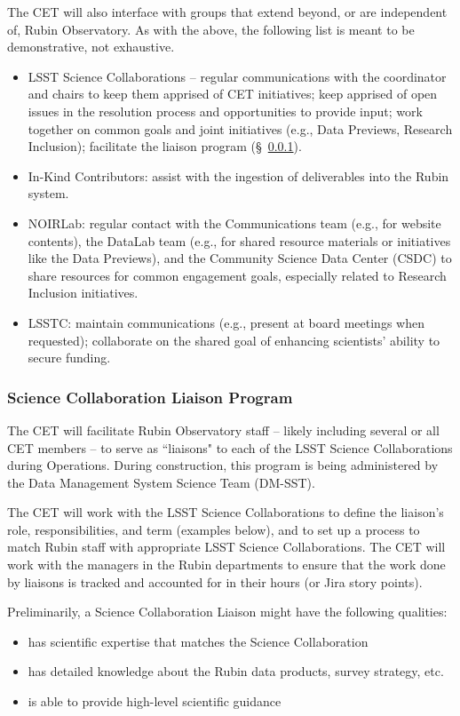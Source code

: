 \documentclass[DM,lsstdraft,toc]{lsstdoc}
\begin{document}
The CET will also interface with groups that extend beyond, or are independent of, Rubin Observatory.
As with the above, the following list is meant to be demonstrative, not exhaustive.
\begin{itemize}
\item LSST Science Collaborations -- regular communications with the coordinator and chairs to keep them apprised of CET initiatives; keep apprised of open issues in the resolution process and opportunities to provide input; work together on common goals and joint initiatives (e.g., Data Previews, Research Inclusion); facilitate the liaison program (\S~\ref{sssec:mod_interface_SCliaison}).
\item In-Kind Contributors: assist with the ingestion of deliverables into the Rubin system.
\item NOIRLab: regular contact with the Communications team (e.g., for website contents), the DataLab team (e.g., for shared resource materials or initiatives like the Data Previews), and the Community Science Data Center (CSDC) to share resources for common engagement goals, especially related to Research Inclusion initiatives.
\item LSSTC: maintain communications (e.g., present at board meetings when requested); collaborate on the shared goal of enhancing scientists' ability to secure funding.
\end{itemize}


\subsubsection{Science Collaboration Liaison Program}\label{sssec:mod_interface_SCliaison}

The CET will facilitate Rubin Observatory staff -- likely including several or all CET members -- to serve as ``liaisons" to each of the LSST Science Collaborations during Operations. 
During construction, this program is being administered by the Data Management System Science Team (DM-SST).

The CET will work with the LSST Science Collaborations to define the liaison's role, responsibilities, and term (examples below), and to set up a process to match Rubin staff with appropriate LSST Science Collaborations.
The CET will work with the managers in the Rubin departments to ensure that the work done by liaisons is tracked and accounted for in their hours (or Jira story points). 

Preliminarily, a Science Collaboration Liaison might have the following qualities:
\begin{itemize}
\item has scientific expertise that matches the Science Collaboration
\item has detailed knowledge about the Rubin data products, survey strategy, etc. 
\item is able to provide high-level scientific guidance 
\end{itemize}
\end{document}
